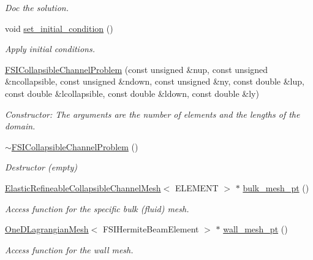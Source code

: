 \begin{DoxyCompactItemize}
\begin{DoxyCompactList}\small\item\em Doc the solution. \end{DoxyCompactList}\item 
void \hyperlink{classFSICollapsibleChannelProblem_afdd6752cb134fd09ee8830158ed557b2}{set\+\_\+initial\+\_\+condition} ()
\begin{DoxyCompactList}\small\item\em Apply initial conditions. \end{DoxyCompactList}\item 
\hyperlink{classFSICollapsibleChannelProblem_afe14ae0d2bdfc9a15969c9bdcd6e2512}{F\+S\+I\+Collapsible\+Channel\+Problem} (const unsigned \&nup, const unsigned \&ncollapsible, const unsigned \&ndown, const unsigned \&ny, const double \&lup, const double \&lcollapsible, const double \&ldown, const double \&ly)
\begin{DoxyCompactList}\small\item\em Constructor\+: The arguments are the number of elements and the lengths of the domain. \end{DoxyCompactList}\item 
\hyperlink{classFSICollapsibleChannelProblem_abe33aaaae15ea3eb10885527a1d1ad9a}{$\sim$\+F\+S\+I\+Collapsible\+Channel\+Problem} ()
\begin{DoxyCompactList}\small\item\em Destructor (empty) \end{DoxyCompactList}\item 
\hyperlink{classElasticRefineableCollapsibleChannelMesh}{Elastic\+Refineable\+Collapsible\+Channel\+Mesh}$<$ E\+L\+E\+M\+E\+NT $>$ $\ast$ \hyperlink{classFSICollapsibleChannelProblem_ac08de7f582e4e2d7e6953edd15707d89}{bulk\+\_\+mesh\+\_\+pt} ()
\begin{DoxyCompactList}\small\item\em Access function for the specific bulk (fluid) mesh. \end{DoxyCompactList}\item 
\hyperlink{classoomph_1_1OneDLagrangianMesh}{One\+D\+Lagrangian\+Mesh}$<$ F\+S\+I\+Hermite\+Beam\+Element $>$ $\ast$ \hyperlink{classFSICollapsibleChannelProblem_ae8b71da8da82f3c52387052ce400b930}{wall\+\_\+mesh\+\_\+pt} ()
\begin{DoxyCompactList}\small\item\em Access function for the wall mesh. \end{DoxyCompactList}\item 

\end{DoxyCompactItemize}
